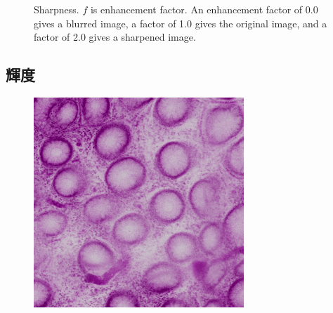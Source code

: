 \begin{figure}[H]
	\caption{Sharpness. $f$ is enhancement factor. An enhancement factor of 0.0 gives a blurred image, a factor of 1.0 gives the original image, and a factor of 2.0 gives a sharpened image.}
	\label{fig:シャープネス}

\end{figure}

\subsection*{輝度}
\begin{figure}[H]
	\centering

	\begin{minipage}{0.25\columnwidth}
		\centering
		\includegraphics[clip, width=\linewidth]{fig/preprocessing/data_aug/color/BRIGHTNESS/BRIGHTNESS_0_80}
	\end{minipage}
	\begin{minipage}{0.25\columnwidth}
		\centering

\end{minipage}
\end{figure}

